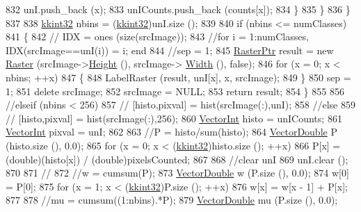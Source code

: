 \begin{DoxyCode}
{{{{{{{{{{{{{{{{{{{{{{{{{{{{{{{{{{{{{{{{{{{{{{{{832         unI.push\_back (x);
833         unICounts.push\_back (counts[x]);
834       \}
835     \}
836   \}
837 
838   \hyperlink{namespace_k_k_b_a8fa4952cc84fda1de4bec1fbdd8d5b1b}{kkint32}  nbins = (\hyperlink{namespace_k_k_b_a8fa4952cc84fda1de4bec1fbdd8d5b1b}{kkint32})unI.size ();
839 
840   \textcolor{keywordflow}{if}  (nbins <= numClasses)
841   \{
842     \textcolor{comment}{// IDX = ones (size(srcImage));}
843     \textcolor{comment}{//for i = 1:numClasses, IDX(srcImage==unI(i)) = i; end}
844     \textcolor{comment}{//sep = 1;}
845     \hyperlink{class_k_k_b_1_1_raster}{RasterPtr}  result = \textcolor{keyword}{new} \hyperlink{class_k_k_b_1_1_raster}{Raster} (srcImage->\hyperlink{class_k_k_b_1_1_raster_af8d10d15697d5b92fb9595c48b529feb}{Height} (), srcImage->
      \hyperlink{class_k_k_b_1_1_raster_aa2780c0b7ae75b7b595f99329689c1f6}{Width} (), \textcolor{keyword}{false});
846     \textcolor{keywordflow}{for}  (x = 0;  x < nbins;  ++x)
847     \{
848       LabelRaster (result, unI[x], x, srcImage);
849     \}
850     sep = 1;
851     \textcolor{keyword}{delete}  srcImage;   
852     srcImage = NULL;
853     \textcolor{keywordflow}{return}  result;
854   \}
855 
856   \textcolor{comment}{//elseif  (nbins < 256)}
857   \textcolor{comment}{//  [histo,pixval] = hist(srcImage(:),unI);}
858   \textcolor{comment}{//else}
859   \textcolor{comment}{//  [histo,pixval] = hist(srcImage(:),256);}
860   \hyperlink{namespace_k_k_b_a791ebe73f89917067a7aab9dbd817e45}{VectorInt}  histo  = unICounts;
861   \hyperlink{namespace_k_k_b_a791ebe73f89917067a7aab9dbd817e45}{VectorInt}  pixval = unI;
862 
863   \textcolor{comment}{//P = histo/sum(histo);}
864   \hyperlink{namespace_k_k_b_a5906c207479607e5f450434095914a41}{VectorDouble}  P (histo.size (), 0.0);
865   \textcolor{keywordflow}{for}  (x = 0;  x < (\hyperlink{namespace_k_k_b_a8fa4952cc84fda1de4bec1fbdd8d5b1b}{kkint32})histo.size ();  ++x)
866     P[x] = (\textcolor{keywordtype}{double})(histo[x]) / (\textcolor{keywordtype}{double})pixelsCounted;
867 
868   \textcolor{comment}{//clear unI}
869   unI.clear ();
870 
871   \textcolor{comment}{//%
872   \textcolor{comment}{//w = cumsum(P);}
873   \hyperlink{namespace_k_k_b_a5906c207479607e5f450434095914a41}{VectorDouble}  w (P.size (), 0.0);
874   w[0] = P[0];
875   \textcolor{keywordflow}{for}  (x = 1;  x < (\hyperlink{namespace_k_k_b_a8fa4952cc84fda1de4bec1fbdd8d5b1b}{kkint32})P.size (); ++x)
876     w[x] = w[x - 1] + P[x];
877 
878   \textcolor{comment}{//mu = cumsum((1:nbins).*P);}
879   \hyperlink{namespace_k_k_b_a5906c207479607e5f450434095914a41}{VectorDouble}  mu (P.size (), 0.0);
}}}}}}}}}}}}}}}}}}}}}}}}}}}}}}}}}}}}}}}}}}}}}}}}}
\end{DoxyCode}
